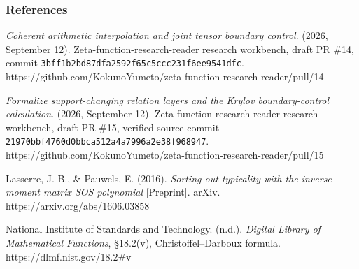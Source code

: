 \subsubsection{References}\label{kernel_layer:references}

\emph{Coherent arithmetic interpolation and joint tensor boundary
control}. (2026, September 12). Zeta-function-research-reader research
workbench, draft PR \#14, commit
\nolinkurl{3bff1b2bd87dfa2592f65c5ccc231f6ee9541dfc}.
https://github.com/KokunoYumeto/zeta-function-research-reader/pull/14

\emph{Formalize support-changing relation layers and the Krylov
boundary-control calculation}. (2026, September 12).
Zeta-function-research-reader research workbench, draft PR \#15,
verified source commit
\nolinkurl{21970bbf4760d0bbca512a4a7996a2e38f968947}.
https://github.com/KokunoYumeto/zeta-function-research-reader/pull/15

Lasserre, J.-B., \& Pauwels, E. (2016). \emph{Sorting out typicality
with the inverse moment matrix SOS polynomial} {[}Preprint{]}. arXiv.
https://arxiv.org/abs/1606.03858

National Institute of Standards and Technology. (n.d.). \emph{Digital
Library of Mathematical Functions}, §18.2(v), Christoffel--Darboux
formula. https://dlmf.nist.gov/18.2\#v


